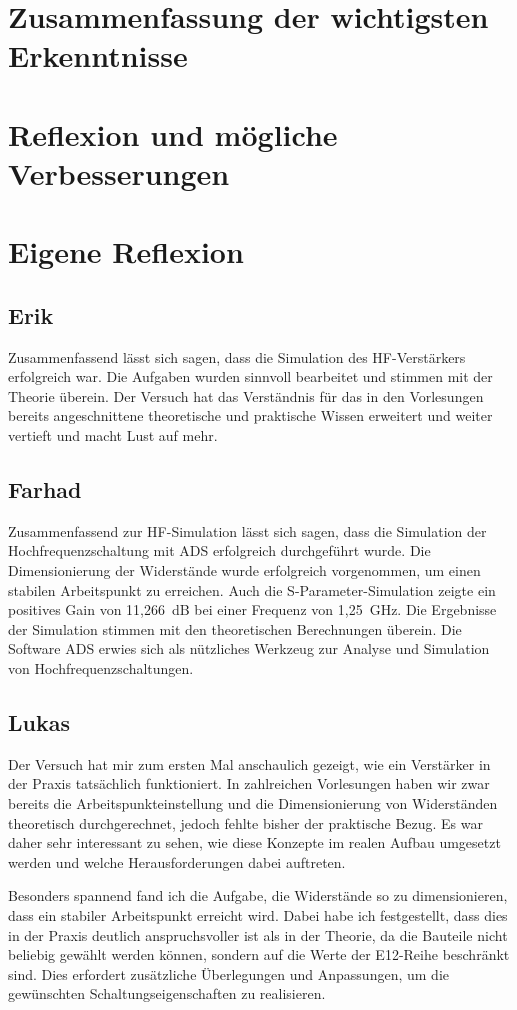 \section{Zusammenfassung der wichtigsten Erkenntnisse}
\section{Reflexion und mögliche Verbesserungen}
\section{Eigene Reflexion}
\subsection{Erik}
Zusammenfassend lässt sich sagen, dass die Simulation des HF-Verstärkers erfolgreich war. Die Aufgaben wurden sinnvoll bearbeitet und stimmen mit der Theorie überein.
Der Versuch hat das Verständnis für das in den Vorlesungen bereits angeschnittene theoretische und praktische Wissen erweitert und weiter vertieft und macht Lust auf mehr.

\subsection{Farhad}
Zusammenfassend zur HF-Simulation lässt sich sagen, dass die Simulation der Hochfrequenzschaltung mit \ac{ADS} erfolgreich durchgeführt wurde. Die Dimensionierung der Widerstände wurde erfolgreich vorgenommen, um einen stabilen Arbeitspunkt zu erreichen. Auch die S-Parameter-Simulation zeigte ein positives Gain von 11,266~dB bei einer Frequenz von 1{,}25~GHz.
Die Ergebnisse der Simulation stimmen mit den theoretischen Berechnungen überein.
Die Software \ac{ADS} erwies sich als nützliches Werkzeug zur Analyse und Simulation von Hochfrequenzschaltungen.

\subsection{Lukas}
Der Versuch hat mir zum ersten Mal anschaulich gezeigt, wie ein Verstärker in der Praxis tatsächlich funktioniert. In zahlreichen Vorlesungen haben wir zwar bereits die Arbeitspunkteinstellung und die Dimensionierung von Widerständen theoretisch durchgerechnet, jedoch fehlte bisher der praktische Bezug. Es war daher sehr interessant zu sehen, wie diese Konzepte im realen Aufbau umgesetzt werden und welche Herausforderungen dabei auftreten.

Besonders spannend fand ich die Aufgabe, die Widerstände so zu dimensionieren, dass ein stabiler Arbeitspunkt erreicht wird. Dabei habe ich festgestellt, dass dies in der Praxis deutlich anspruchsvoller ist als in der Theorie, da die Bauteile nicht beliebig gewählt werden können, sondern auf die Werte der E12-Reihe beschränkt sind. Dies erfordert zusätzliche Überlegungen und Anpassungen, um die gewünschten Schaltungseigenschaften zu realisieren.


\clearpage